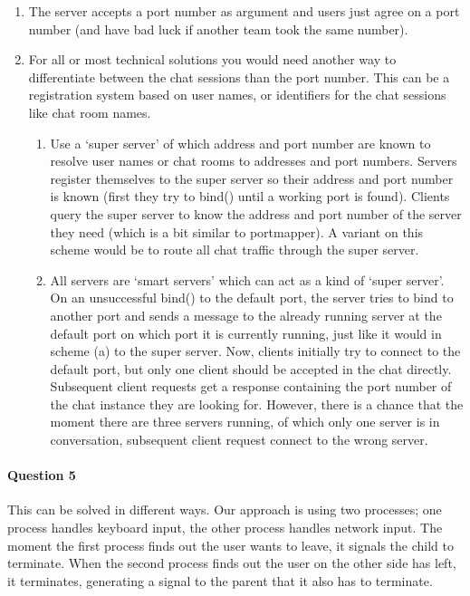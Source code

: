 \documentclass[a4paper,10pt]{article}
\begin{document}
\begin{enumerate}
\item The server accepts a port number as argument and users just agree on a port number (and have bad luck if another team took the same number).
\item For all or most technical solutions you would need another way to differentiate between the chat sessions than the port number. This can be a registration system based on user names, or identifiers for the chat sessions like chat room names.
	\begin{enumerate}
	\item Use a `super server' of which address and port number are known to resolve user names or chat rooms to addresses and port numbers. Servers register themselves to the super server so their address and port number is known (first they try to bind() until a working port is found). Clients query the super server to know the address and port number of the server they need (which is a bit similar to portmapper). A variant on this scheme would be to route all chat traffic through the super server.
	\item All servers are `smart servers' which can act as a kind of `super server'. On an unsuccessful bind() to the default port, the server tries to bind to another port and sends a message to the already running server at the default port on which port it is currently running, just like it would in scheme (a) to the super server. Now, clients initially try to connect to the default port, but only one client should be accepted in the chat directly. Subsequent client requests get a response containing the port number of the chat instance they are looking for. However, there is a chance that the moment there are three servers running, of which only one server is in conversation, subsequent client request connect to the wrong server.
	\end{enumerate}
\end{enumerate}

\paragraph{Question 5}
This can be solved in different ways. Our approach is using two processes; one process handles keyboard input, the other process handles network input. The moment the first process finds out the user wants to leave, it signals the child to terminate. When the second process finds out the user on the other side has left, it terminates, generating a signal to the parent that it also has to terminate.
\end{document}
